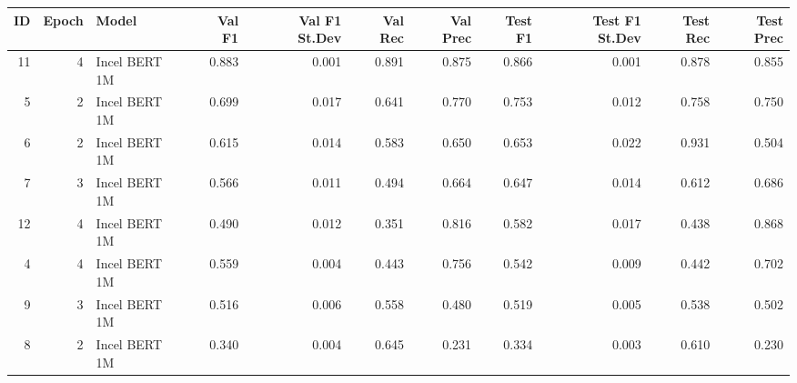 \begin{tabular}{rrlrrrrrrrr}
\toprule
 ID &  Epoch &         Model &  Val F1 &  Val F1 St.Dev &  Val Rec &  Val Prec &  Test F1 &  Test F1 St.Dev &  Test Rec &  Test Prec \\
\midrule
 11 &      4 & Incel BERT 1M &   0.883 &          0.001 &    0.891 &     0.875 &    0.866 &           0.001 &     0.878 &      0.855 \\
  5 &      2 & Incel BERT 1M &   0.699 &          0.017 &    0.641 &     0.770 &    0.753 &           0.012 &     0.758 &      0.750 \\
  6 &      2 & Incel BERT 1M &   0.615 &          0.014 &    0.583 &     0.650 &    0.653 &           0.022 &     0.931 &      0.504 \\
  7 &      3 & Incel BERT 1M &   0.566 &          0.011 &    0.494 &     0.664 &    0.647 &           0.014 &     0.612 &      0.686 \\
 12 &      4 & Incel BERT 1M &   0.490 &          0.012 &    0.351 &     0.816 &    0.582 &           0.017 &     0.438 &      0.868 \\
  4 &      4 & Incel BERT 1M &   0.559 &          0.004 &    0.443 &     0.756 &    0.542 &           0.009 &     0.442 &      0.702 \\
  9 &      3 & Incel BERT 1M &   0.516 &          0.006 &    0.558 &     0.480 &    0.519 &           0.005 &     0.538 &      0.502 \\
  8 &      2 & Incel BERT 1M &   0.340 &          0.004 &    0.645 &     0.231 &    0.334 &           0.003 &     0.610 &      0.230 \\
\bottomrule
\end{tabular}
